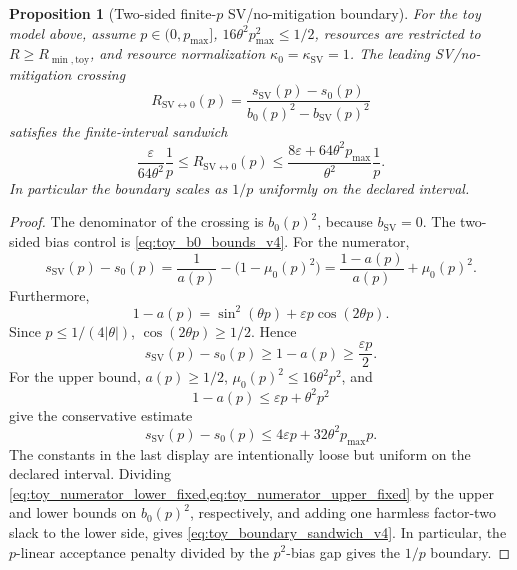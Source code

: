 \documentclass[11pt]{article}
\newtheorem{proposition}{Proposition}
\newcommand{\1}{\mathbf{1}}
\begin{document}
\begin{proposition}[Two-sided finite-\(p\) SV/no-mitigation boundary]
\label{prop:toy_two_sided_boundary_v4}
For the toy model above, assume \(p\in(0,p_{\max}]\), \(16\theta^2p_{\max}^2\leq1/2\), resources are restricted to \(R\ge R_{\min,\mathrm{toy}}\), and resource normalization \(\kappa_0=\kappa_{\mathrm{SV}}=1\).  The leading SV/no-mitigation crossing
\begin{equation}
    R_{\mathrm{SV}\leftrightarrow0}(p)
    =\frac{s_{\mathrm{SV}}(p)-s_0(p)}{b_0(p)^2-b_{\mathrm{SV}}(p)^2}
\end{equation}
satisfies the finite-interval sandwich
\begin{equation}
    \frac{\varepsilon}{64\theta^2}\frac1p
    \leq
    R_{\mathrm{SV}\leftrightarrow0}(p)
    \leq
    \frac{8\varepsilon+64\theta^2p_{\max}}{\theta^2}\frac1p.
    \label{eq:toy_boundary_sandwich_v4}
\end{equation}
In particular the boundary scales as \(1/p\) uniformly on the declared interval.
\end{proposition}

\begin{proof}
The denominator of the crossing is \(b_0(p)^2\), because \(b_{\mathrm{SV}}=0\).  The two-sided bias control is \cref{eq:toy_b0_bounds_v4}.  For the numerator,
\begin{equation}
    s_{\mathrm{SV}}(p)-s_0(p)
    =\frac1{a(p)}-\bigl(1-\mu_0(p)^2\bigr)
    =\frac{1-a(p)}{a(p)}+\mu_0(p)^2.
\end{equation}
Furthermore,
\begin{equation}
    1-a(p)
    =\sin^2(\theta p)+\varepsilon p\cos(2\theta p).
\end{equation}
Since \(p\leq1/(4|\theta|)\), \(\cos(2\theta p)\geq1/2\).  Hence
\begin{equation}
    s_{\mathrm{SV}}(p)-s_0(p)\geq 1-a(p)\geq \frac{\varepsilon p}{2}.
    \label{eq:toy_numerator_lower_fixed}
\end{equation}
For the upper bound, \(a(p)\geq1/2\), \(\mu_0(p)^2\leq16\theta^2p^2\), and
\[
    1-a(p)\leq \varepsilon p+\theta^2p^2
\]
give the conservative estimate
\begin{equation}
    s_{\mathrm{SV}}(p)-s_0(p)
    \leq 4\varepsilon p+32\theta^2p_{\max}p.
    \label{eq:toy_numerator_upper_fixed}
\end{equation}
The constants in the last display are intentionally loose but uniform on the declared interval.  Dividing \cref{eq:toy_numerator_lower_fixed,eq:toy_numerator_upper_fixed} by the upper and lower bounds on \(b_0(p)^2\), respectively, and adding one harmless factor-two slack to the lower side, gives \cref{eq:toy_boundary_sandwich_v4}.  In particular, the \(p\)-linear acceptance penalty divided by the \(p^2\)-bias gap gives the \(1/p\) boundary.
\end{proof}
\end{document}
